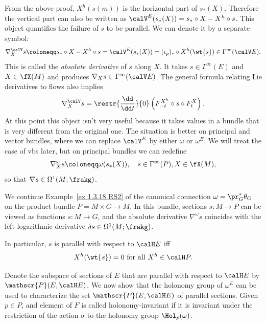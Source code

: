 \begin{rem}\label{rem absolute derivative}
    From the above proof, $X^h(s(m))$ is the horizontal part of $s_\ast(X)$. Therefore the vertical part can also be written as $\calV^E(s_\ast(X))=s_\ast\circ X-X^h\circ s$. This object quantifies the failure of $s$ to be parallel. We can denote it by a separate symbol:
    \[\nabla_X^{\calV} s\coloneqq s_\ast\circ X-X^h\circ s=\calV^E(s_\ast(X))=(\iota_p)_\ast\circ X^h(\wt{s})\in\Gamma^\infty(\calV E).\]
    This is called the \emph{absolute derivative} of $s$ along $X$. It takes $s\in\Gamma^\infty(E)$ and $X\in\fX(M)$ and produces $\nabla_X s\in \Gamma^\infty(\calV E)$. The general formula relating Lie derivatives to flows also implies
    \[\nabla_X^{\calV} s=\restr{\frac{\dd}{\dd t}}{0}\left(F^{X^h}_{-t}\circ s\circ F^X_t\right).\]
    At this point this object isn't very useful because it takes values in a bundle that is very different from the original one. The situation is better on principal and vector bundles, where we can replace $\calV^E$ by either $\omega$ or $\omega^E$. We will treat the case of \glspl{vb} later, but on principal bundles we can redefine
    \[\nabla_X^\omega s\coloneqq \omega(s_\ast(X)), \quad s\in\Gamma^\infty(P),X\in\fX(M),\]
    so that $\nabla s\in\Omega^1(M;\frakg)$.
\end{rem}


\begin{example}
    We continue Example~\ref{ex 1.3.18 RS2} of the canonical connection $\omega=\pr_G^\ast\theta_G$ on the product bundle $P=M\times G\to M$. In this bundle, sections $s:M\to P$ can be viewed as functions $s:M\to G$, and the absolute derivative $\nabla^\omega s$ coincides with the left logarithmic derivative $\delta s\in\Omega^1(M;\frakg)$.
\end{example}



\begin{cor}\label{cor 1.5.7 RS2 my version}
    In particular, $s$ is parallel with respect to $\calH E$ iff
    \[X^h(\wt{s})=0\text{ for all }X^h\in\calH P.\]
\end{cor}


Denote the subspace of sections of $E$ that are parallel with respect to $\calH E$ by $\mathscr{P}(E,\calH E)$.  We now show that the holonomy group of $\omega^E$ can be used to characterize the set $\mathscr{P}(E,\calH E)$ of parallel sections. Given $p\in P$, and element of $F$ is called holonomy-invariant if it is invariant under the restriction of the action $\sigma$ to the holonomy group $\Hol_p(\omega)$.

